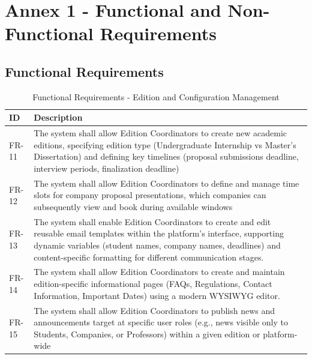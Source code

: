 %

\chapter{Annex 1 - Functional and Non-Functional Requirements}
\label{ann:fr_nfr_annex}

\section*{Functional Requirements}
{
    \begin{table}[H]
        \centering
        \caption{Functional Requirements - Edition and Configuration Management}
        \label{tab:freq-edition-config} 
        \begin{tabular}{|l|p{12cm}|} %
            \hline
            \textbf{ID} & \textbf{Description} \\ \hline
            FR-11 & The system shall allow Edition Coordinators to create new academic editions, specifying edition type (Undergraduate Internship vs Master’s Dissertation) and defining key timelines (proposal submissions deadline, interview periods, finalization deadline)\\ \hline
            FR-12 & The system shall allow Edition Coordinators to define and manage time slots for company proposal presentations, which companies can subsequently view and book during available windows \\ \hline
            FR-13 & The system shall enable Edition Coordinators to create and edit reusable email templates within the platform's interface, supporting dynamic variables (student names, company names, deadlines) and content-specific formatting for different communication stages. \\ \hline
            FR-14 & The system shall allow Edition Coordinators to create and maintain edition-specific informational pages (FAQs, Regulations, Contact Information, Important Dates) using a modern WYSIWYG editor. \\ \hline
            FR-15 & The system shall allow Edition Coordinators to publish news and announcements target at specific user roles (e.g., news visible only to Students, Companies, or Professors) within a given edition or platform-wide \\ \hline
        \end{tabular}
    \end{table}    
}

